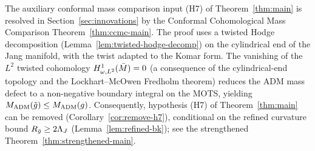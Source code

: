 \begin{remark}\label{rem:ccmc-resolution}
The auxiliary conformal mass comparison input (H7) of Theorem~\ref{thm:main} is resolved in Section~\ref{sec:innovations} by the Conformal Cohomological Mass Comparison Theorem~\ref{thm:ccmc-main}. The proof uses a twisted Hodge decomposition (Lemma~\ref{lem:twisted-hodge-decomp}) on the cylindrical end of the Jang manifold, with the twist adapted to the Komar form. The vanishing of the $L^2$ twisted cohomology $H^1_{\omega, L^2}(\bar{M}) = 0$ (a consequence of the cylindrical-end topology and the Lockhart--McOwen Fredholm theorem) reduces the ADM mass defect to a non-negative boundary integral on the MOTS, yielding $M_{\mathrm{ADM}}(\tilde{g}) \leq M_{\mathrm{ADM}}(g)$. Consequently, hypothesis (H7) of Theorem~\ref{thm:main} can be removed (Corollary~\ref{cor:remove-h7}), conditional on the refined curvature bound $R_{\bar{g}} \geq 2\Lambda_J$ (Lemma~\ref{lem:refined-bk}); see the strengthened Theorem~\ref{thm:strengthened-main}.
\end{remark}

